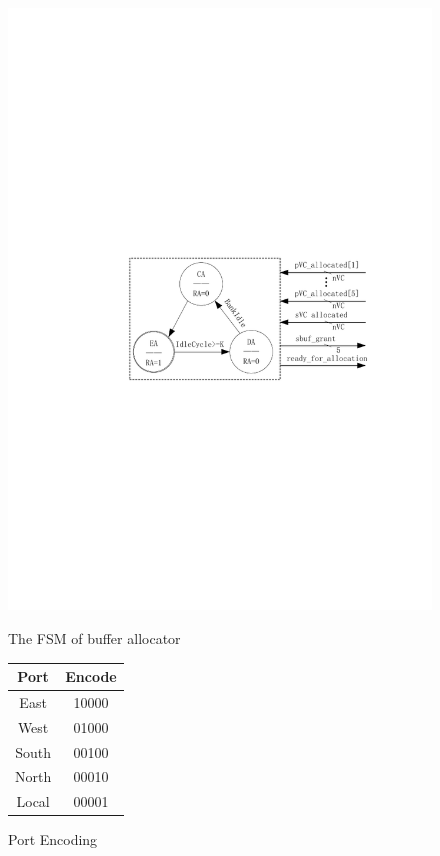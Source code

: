 \documentclass[10pt,conference]{IEEEtran}
\begin{document}
\begin{figure}[htb]
  \begin{minipage}[b]{0.3\textwidth}
    \centering\includegraphics[scale=0.5]{figures/allocFSM.pdf}
    \caption{The FSM of buffer allocator}\label{allocFSM}
  \end{minipage}%
  \begin{minipage}[b]{0.2\textwidth}
    \centering
    \begin{tabular}{|c|c|}
      \hline
      Port & Encode \\
      \hline\hline
      East  & 10000 \\
      \hline
      West    & 01000 \\
      \hline
      South &   00100\\
      \hline
      North & 00010\\
      \hline
      Local & 00001\\
      \hline
    \end{tabular}
    \caption{Port Encoding}\label{portencode}
  \end{minipage}
\end{figure}
\end{document}
